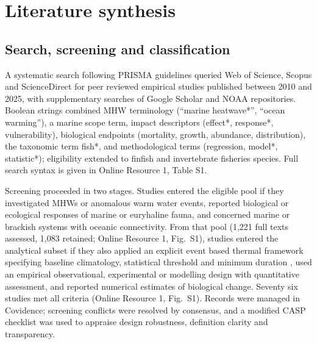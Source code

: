 \section{Literature synthesis}\label{sec:synthesis}

\subsection{Search, screening and classification}\label{sec:litmethods}

A systematic search following PRISMA guidelines queried Web of Science, Scopus and ScienceDirect for peer reviewed empirical studies published between 2010 and 2025, with supplementary searches of Google Scholar and NOAA repositories. Boolean strings combined MHW terminology (``marine heatwave*'', ``ocean warming''), a marine scope term, impact descriptors (effect*, response*, vulnerability), biological endpoints (mortality, growth, abundance, distribution), the taxonomic term fish*, and methodological terms (regression, model*, statistic*); eligibility extended to finfish and invertebrate fisheries species. Full search syntax is given in Online Resource 1, Table S1.

Screening proceeded in two stages. Studies entered the eligible pool if they investigated MHWs or anomalous warm water events, reported biological or ecological responses of marine or euryhaline fauna, and concerned marine or brackish systems with oceanic connectivity. From that pool (1,221 full texts assessed, 1,083 retained; Online Resource 1, Fig.~S1), studies entered the analytical subset if they also applied an explicit event based thermal framework specifying baseline climatology, statistical threshold and minimum duration \citep[or equivalent;][]{hobday2016}, used an empirical observational, experimental or modelling design with quantitative assessment, and reported numerical estimates of biological change. Seventy six studies met all criteria (Online Resource 1, Fig.~S1). Records were managed in Covidence; screening conflicts were resolved by consensus, and a modified CASP checklist was used to appraise design robustness, definition clarity and transparency.

